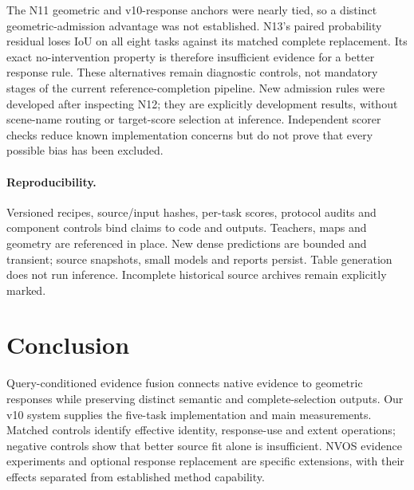 The N11 geometric and v10-response anchors were nearly tied, so a distinct
geometric-admission advantage was not established. N13's paired probability
residual loses IoU on all eight tasks against its matched complete replacement.
Its exact no-intervention property is therefore insufficient evidence for a
better response rule. These alternatives remain diagnostic controls, not
mandatory stages of the current reference-completion pipeline. New admission
rules were developed after inspecting N12; they are explicitly development
results, without scene-name routing or target-score selection at inference.
Independent scorer checks reduce
known implementation concerns but do not prove that every possible bias has
been excluded.

\paragraph{Reproducibility.}
Versioned recipes, source/input hashes, per-task scores, protocol audits and
component controls bind claims to code and outputs. Teachers, maps and geometry
are referenced in place. New dense predictions are bounded and transient;
source snapshots, small models and reports persist. Table generation does not
run inference. Incomplete historical source archives remain explicitly marked.

\section{Conclusion}
Query-conditioned evidence fusion connects native evidence to geometric
responses while preserving distinct semantic and complete-selection outputs.
Our v10 system supplies the five-task implementation and main measurements.
Matched controls identify effective identity, response-use and extent operations;
negative controls show that better source fit alone is insufficient. NVOS
evidence experiments and optional response replacement are specific extensions,
with their effects separated from established method capability.

